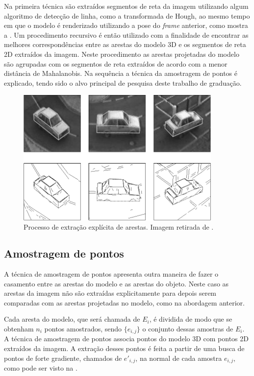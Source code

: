 \label{sec:extracao_explicita}
Na primeira técnica são extraídos segmentos de reta da imagem utilizando algum algoritmo de detecção de linha, como a transformada de Hough, ao mesmo tempo em que o modelo é renderizado utilizando a pose do \emph{frame} anterior, como mostra a . Um procedimento recursivo é então utilizado com a finalidade de encontrar as melhores correspondências entre as arestas do modelo 3D e os segmentos de reta 2D extraídos da imagem. Neste procedimento as arestas projetadas do modelo são agrupadas com os segmentos de reta extraídos de acordo com a menor distância de Mahalanobis. Na sequência a técnica da amostragem de pontos é explicado, tendo sido o alvo principal de pesquisa deste trabalho de graduação.

\begin{figure}[!t]
\centering\includegraphics[width=0.9\textwidth]{monografia/carro_extracao_explicita}
\caption{Processo de extração explícita de arestas. Imagem retirada de \cite{extracao_explicita}.}
\label{carro_extracao_explicita}
\end{figure}

\subsection{Amostragem de pontos}
\label{sec:amostragem_de_pontos}

A técnica de amostragem de pontos \cite{drummondecipolla} apresenta outra maneira de fazer o casamento entre as arestas do modelo e as arestas do objeto. Neste caso as arestas da imagem não são extraídas explicitamente para depois serem comparadas com as arestas projetadas no modelo, como na abordagem anterior.

Cada aresta do modelo, que será chamada de $E_i$, é dividida de modo que se obtenham $n_i$ pontos amostrados, sendo $\{e_{i,j}\}$ o conjunto dessas amostras de $E_i$. A técnica de amostragem de pontos associa pontos do modelo 3D com pontos 2D extraídos da imagem. A extração desses pontos é feita a partir de uma busca de pontos de forte gradiente, chamados de $e'_{i,j}$, na normal de cada amostra $e_{i,j}$, como pode ser visto na .

